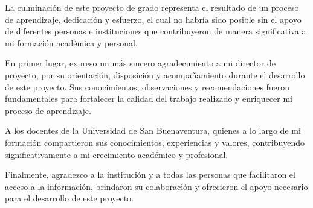  \begin{center}
    La culminación de este proyecto de grado representa el resultado de un proceso de aprendizaje, dedicación y esfuerzo, el cual no habría sido posible sin el apoyo de diferentes personas e instituciones que contribuyeron de manera significativa a mi formación académica y personal.
    
    En primer lugar, expreso mi más sincero agradecimiento a mi director de proyecto, por su orientación, disposición y acompañamiento durante el desarrollo de este proyecto. Sus conocimientos, observaciones y recomendaciones fueron fundamentales para fortalecer la calidad del trabajo realizado y enriquecer mi proceso de aprendizaje.
    
    A los docentes de la Universidad de San Buenaventura, quienes a lo largo de mi formación compartieron sus conocimientos, experiencias y valores, contribuyendo significativamente a mi crecimiento académico y profesional.
    
    Finalmente, agradezco a la institución y a todas las personas que facilitaron el acceso a la información, brindaron su colaboración y ofrecieron el apoyo necesario para el desarrollo de este proyecto.
    
 \end{center}
 
 

\cleardoublepage{}
